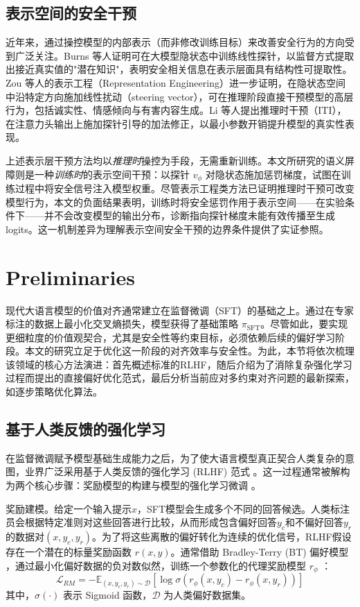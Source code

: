 \documentclass[lettersize,journal]{IEEEtran}
\begin{document}
\subsection{表示空间的安全干预}

近年来，通过操控模型的内部表示（而非修改训练目标）来改善安全行为的方向受到广泛关注。Burns 等人\cite{burns2023discovering}证明可在大模型隐状态中训练线性探针，以监督方式提取出接近真实值的"潜在知识"，表明安全相关信息在表示层面具有结构性可提取性。Zou 等人\cite{zou2023representation}的表示工程（Representation Engineering）进一步证明，在隐状态空间中沿特定方向施加线性扰动（steering vector），可在推理阶段直接干预模型的高层行为，包括诚实性、情感倾向与有害内容生成。Li 等人\cite{li2023inference}提出推理时干预（ITI），在注意力头输出上施加探针引导的加法修正，以最小参数开销提升模型的真实性表现。

上述表示层干预方法均以\emph{推理时}操控为手段，无需重新训练。本文所研究的语义屏障则是一种\emph{训练时}的表示空间干预：以探针 $v_\phi$ 对隐状态施加惩罚梯度，试图在训练过程中将安全信号注入模型权重。尽管表示工程类方法已证明推理时干预可改变模型行为，本文的负面结果表明，训练时将安全惩罚作用于表示空间——在实验条件下——并不会改变模型的输出分布，诊断指向探针梯度未能有效传播至生成 logits。这一机制差异为理解表示空间安全干预的边界条件提供了实证参照。

\section{Preliminaries}
现代大语言模型的价值对齐通常建立在监督微调（SFT）的基础之上。通过在专家标注的数据上最小化交叉熵损失，模型获得了基础策略 $\pi_{\text{SFT}}$。尽管如此，要实现更细粒度的价值观契合，尤其是安全性等约束目标，必须依赖后续的偏好学习阶段\cite{ziegler2019fine}。本文的研究立足于优化这一阶段的对齐效率与安全性。为此，本节将依次梳理该领域的核心方法演进：首先概述标准的RLHF，随后介绍为了消除复杂强化学习过程而提出的直接偏好优化范式，最后分析当前应对多约束对齐问题的最新探索，如逐步策略优化算法\cite{wachi2024stepwise}。
\subsection{基于人类反馈的强化学习}
在监督微调赋予模型基础生成能力之后，为了使大语言模型真正契合人类复杂的意图，业界广泛采用基于人类反馈的强化学习 (RLHF) 范式 。这一过程通常被解构为两个核心步骤：奖励模型的构建与模型的强化学习微调 。

奖励建模。给定一个输入提示$x$，SFT模型会生成多个不同的回答候选。人类标注员会根据特定准则对这些回答进行比较，从而形成包含偏好回答$y_c$和不偏好回答$y_r$的数据对$(x, y_c, y_r)$。为了将这些离散的偏好转化为连续的优化信号，RLHF假设存在一个潜在的标量奖励函数 $r(x, y)$。通常借助 Bradley-Terry (BT) 偏好模型 ，通过最小化偏好数据的负对数似然，训练一个参数化的代理奖励模型 $r_\phi$ ：
\begin{equation}
    \mathcal{L}_{RM} = -\mathbb{E}_{(x, y_c, y_r) \sim \mathcal{D}} [\log \sigma(r_\phi(x, y_c) - r_\phi(x, y_r))]
\end{equation}
其中，$\sigma(\cdot)$ 表示 Sigmoid 函数，$\mathcal{D}$ 为人类偏好数据集。
\end{document}

